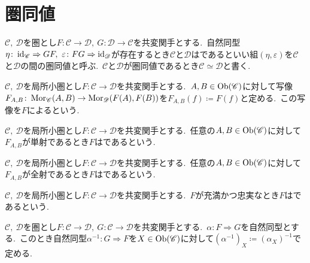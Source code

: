 
\section{圏同値}

\begin{definition} \label{def: Equivalence}
$\mathscr{C},\ \mathscr{D}$を圏とし$F \colon \mathscr{C} \to \mathscr{D},\ G \colon \mathscr{D} \to \mathscr{C}$を共変関手とする.\
自然同型$\eta \colon \id_{\mathscr{C}} \Rightarrow GF,\ \varepsilon \colon FG \Rightarrow \id_{\mathscr{D}}$が存在するとき$\mathscr{C}$と$\mathscr{D}$はであるといい組$(\eta,\varepsilon)$を$\mathscr{C}$と$\mathscr{D}$の間の圏同値と呼ぶ.\ $\mathscr{C}$と$\mathscr{D}$が圏同値であるとき$\mathscr{C} \simeq \mathscr{D}$と書く.
\end{definition}

\begin{definition}
$\mathscr{C},\ \mathscr{D}$を局所小圏とし$F \colon \mathscr{C} \to \mathscr{D}$を共変関手とする.\
$A, B \in \operatorname{Ob}(\mathscr{C})$に対して写像$F_{A,B} \colon \operatorname{Mor}_{\mathscr{C}}(A, B) \to \operatorname{Mor}_{\mathscr{D}}(F(A), F(B))$を$F_{A,B}(f) \coloneq F(f)$と定める.\
この写像を$F$によるという.
\end{definition}

\begin{definition}
$\mathscr{C},\ \mathscr{D}$を局所小圏とし$F \colon \mathscr{C} \to \mathscr{D}$を共変関手とする.\
任意の$A, B \in \operatorname{Ob}(\mathscr{C})$に対して$F_{A,B}$が単射であるとき$F$はであるという.\
\end{definition}

\begin{definition}
$\mathscr{C},\ \mathscr{D}$を局所小圏とし$F \colon \mathscr{C} \to \mathscr{D}$を共変関手とする.\
任意の$A, B \in \operatorname{Ob}(\mathscr{C})$に対して$F_{A,B}$が全射であるとき$F$はであるという.\
\end{definition}

\begin{definition}
$\mathscr{C},\ \mathscr{D}$を局所小圏とし$F \colon \mathscr{C} \to \mathscr{D}$を共変関手とする.\
$F$が充満かつ忠実なとき$F$はであるという.
\end{definition}

\begin{definition}
$\mathscr{C},\ \mathscr{D}$を圏とし$F \colon \mathscr{C} \to \mathscr{D},\ G \colon \mathscr{C} \to \mathscr{D}$を共変関手とする.\
$\alpha \colon F \Rightarrow G$を自然同型とする.\
このとき自然同型$\alpha^{-1} \colon G \Rightarrow F$を$X \in \operatorname{Ob}(\mathscr{C})$に対して$(\alpha^{-1})_X \coloneq (\alpha_X)^{-1}$で定める.
\end{definition}

